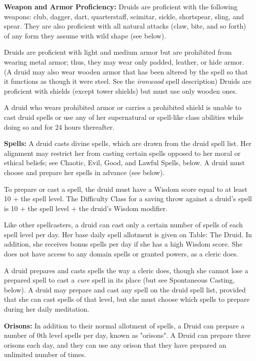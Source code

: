 \classfeatures

\textbf{Weapon and Armor Proficiency:} Druids are proficient with the following weapons: club, dagger, dart, quarterstaff, scimitar, sickle, shortspear, sling, and spear. They are also proficient with all natural attacks (claw, bite, and so forth) of any form they assume with wild shape (see below).

Druids are proficient with light and medium armor but are prohibited from wearing metal armor; thus, they may wear only padded, leather, or hide armor. (A druid may also wear wooden armor that has been altered by the  spell so that it functions as though it were steel. See the \textit{ironwood} spell description) Druids are proficient with shields (except tower shields) but must use only wooden ones.

A druid who wears prohibited armor or carries a prohibited shield is unable to cast druid spells or use any of her supernatural or spell-like class abilities while doing so and for 24 hours thereafter.

\textbf{Spells:} A druid casts divine spells, which are drawn from the druid spell list. Her alignment may restrict her from casting certain spells opposed to her moral or ethical beliefs; see Chaotic, Evil, Good, and Lawful Spells, below. A druid must choose and prepare her spells in advance (see below).

To prepare or cast a spell, the druid must have a Wisdom score equal to at least 10 + the spell level. The Difficulty Class for a saving throw against a druid's spell is 10 + the spell level + the druid's Wisdom modifier.

Like other spellcasters, a druid can cast only a certain number of spells of each spell level per day. Her base daily spell allotment is given on Table: The Druid. In addition, she receives bonus spells per day if she has a high Wisdom score. She does not have access to any domain spells or granted powers, as a cleric does.

A druid prepares and casts spells the way a cleric does, though she cannot lose a prepared spell to cast a \textit{cure} spell in its place (but see Spontaneous Casting, below). A druid may prepare and cast any spell on the druid spell list, provided that she can cast spells of that level, but she must choose which spells to prepare during her daily meditation.

\textbf{Orisons:} In addition to their normal allotment of spells, a Druid can prepare a number of 0th level spells per day, known as "orisons". A Druid can prepare three orisons each day, and they can use any orison that they have prepared an unlimited number of times.

